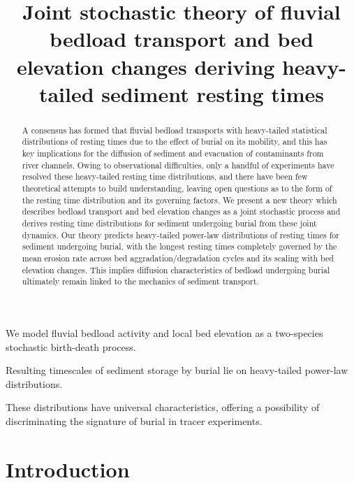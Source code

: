 \documentclass[draft]{agujournal2018}
\begin{document}
\title{Joint stochastic theory of fluvial bedload transport and bed elevation changes deriving heavy-tailed sediment resting times}

\begin{keypoints}
\item We model fluvial bedload activity and local bed elevation as a two-species stochastic birth-death process.
\item Resulting timescales of sediment storage by burial lie on heavy-tailed power-law distributions.
\item These distributions have universal characteristics, offering a possibility of discriminating the signature of burial in tracer experiments.
\end{keypoints}

\begin{abstract}
A consensus has formed that fluvial bedload transports with heavy-tailed statistical distributions of resting times due to the effect of burial on its mobility, and this has key implications for the diffusion of sediment and evacuation of contaminants from river channels.
Owing to observational difficulties, only a handful of experiments have resolved these heavy-tailed resting time distributions, and there have been few theoretical attempts to build understanding, leaving open questions as to the form of the resting time distribution and its governing factors.
We present a new theory which describes bedload transport and bed elevation changes as a joint stochastic process and derives resting time distributions for sediment undergoing burial from these joint dynamics.
Our theory predicts heavy-tailed power-law distributions of resting times for sediment undergoing burial, with the longest resting times completely governed by the mean erosion rate across bed aggradation/degradation cycles and its scaling with bed elevation changes.
This implies diffusion characteristics of bedload undergoing burial ultimately remain linked to the mechanics of sediment transport.
\end{abstract} 

\section{Introduction}
\end{document}
